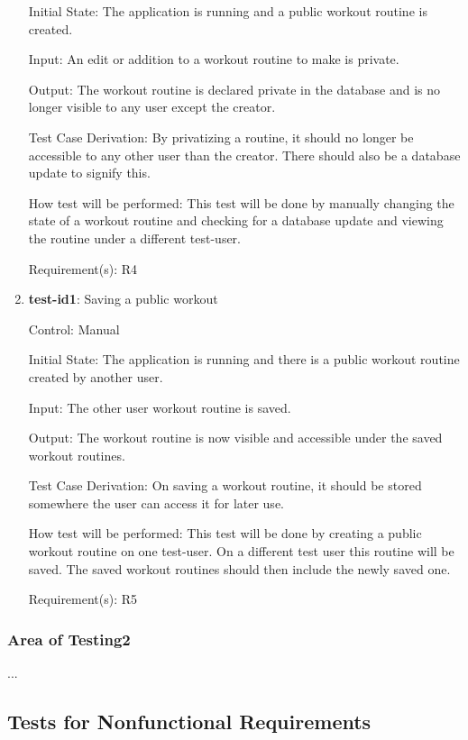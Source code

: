 \documentclass[12pt, titlepage]{article}
\begin{document}
\begin{enumerate}
		Initial State: The application is running and a public workout routine is created.
		
		Input: An edit or addition to a workout routine to make is private.
		
		Output: The workout routine is declared private in the database and is no longer visible to any user except the creator.
		
		Test Case Derivation: By privatizing a routine, it should no longer be accessible to any other user than the creator. There should also be a database update to signify this.
		
		How test will be performed: This test will be done by manually changing the state of a workout routine and checking for a database update and viewing the routine under a different test-user.
		
		Requirement(s): R4
		
		\item{\textbf{test-id1}}: Saving a public workout
		
		Control: Manual
		
		Initial State: The application is running and there is a public workout routine created by another user.
		
		Input: The other user workout routine is saved.
		
		Output: The workout routine is now visible and accessible under the saved workout routines.
		
		Test Case Derivation: On saving a workout routine, it should be stored somewhere the user can access it for later use.
		
		How test will be performed: This test will be done by creating a public workout routine on one test-user. On a different test user this routine will be saved. The saved workout routines should then include the newly saved one.
		
		Requirement(s): R5
		
	\end{enumerate}
	
	\subsubsection{Area of Testing2}
	
	...
	
	\subsection{Tests for Nonfunctional Requirements}
	
\end{document}

